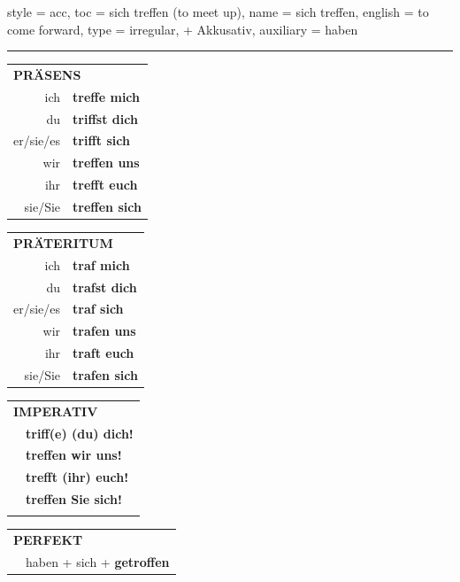 \begin{verbentry}{
  style = {acc},
  toc = {sich treffen (to meet up)},
  name = {sich treffen},
  english = {to come forward},
  type = {irregular, + Akkusativ},
  auxiliary = {haben}
}
 
    
       \vspace{5pt}

    \hrule
    
    \vspace{5pt}

  \begin{tabular}{rl}
     \multicolumn{2}{l}{\textbf{PRÄSENS} }\\
    ich & \textbf{treffe mich}\\
    du & \textbf{triffst dich}\\
    er/sie/es & \textbf{trifft sich}\\
    wir & \textbf{treffen uns}\\
    ihr & \textbf{trefft euch}\\
    sie/Sie & \textbf{treffen sich}\\
  \end{tabular}
  \hfill
     \begin{tabular}{rl}
    \multicolumn{2}{l}{\textbf{PRÄTERITUM} }\\
    ich & \textbf{traf mich}\\
    du & \textbf{trafst dich}\\
    er/sie/es & \textbf{traf sich}\\
    wir & \textbf{trafen uns}\\
    ihr & \textbf{traft euch}\\
    sie/Sie & \textbf{trafen sich}\\
  \end{tabular}
  \hfill
  \begin{tabular}{rl}
     \multicolumn{2}{l}{\textbf{IMPERATIV} }\\
   & \textbf{triff(e) (du) dich!}\\
   & \textbf{treffen wir uns!}\\
   & \textbf{trefft (ihr) euch!}\\
   & \textbf{treffen Sie sich!}\\
   & \vspace{10pt}
  \end{tabular}

    \vspace{10pt}

 \begin{tabular}{rl}
     \multicolumn{2}{l}{\textbf{PERFEKT}}\\
    &haben + sich + \textbf{getroffen}\\
  \end{tabular}
\hfill
   \begin{tabular}{rl}
   

\end{tabular}
\end{verbentry}
